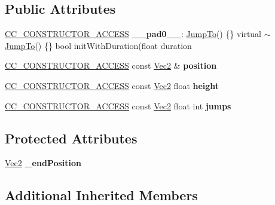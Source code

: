 \subsection*{Public Attributes}
\begin{DoxyCompactItemize}
\item 
\mbox{\label{classJumpTo_acccae872c5de91cdd1bdb469b8a07ce9}} 
\hyperlink{_2cocos2d_2cocos_2base_2ccConfig_8h_a25ef1314f97c35a2ed3d029b0ead6da0}{C\+C\+\_\+\+C\+O\+N\+S\+T\+R\+U\+C\+T\+O\+R\+\_\+\+A\+C\+C\+E\+SS} {\bfseries \+\_\+\+\_\+pad0\+\_\+\+\_\+}\+: \hyperlink{classJumpTo}{Jump\+To}() \{\} virtual $\sim$\hyperlink{classJumpTo}{Jump\+To}() \{\} bool init\+With\+Duration(float duration
\item 
\mbox{\label{classJumpTo_a5449c463ff3535a730153d6dbfb94b71}} 
\hyperlink{_2cocos2d_2cocos_2base_2ccConfig_8h_a25ef1314f97c35a2ed3d029b0ead6da0}{C\+C\+\_\+\+C\+O\+N\+S\+T\+R\+U\+C\+T\+O\+R\+\_\+\+A\+C\+C\+E\+SS} const \hyperlink{classVec2}{Vec2} \& {\bfseries position}
\item 
\mbox{\label{classJumpTo_a3d949c0bd312d4f242084156cedd2be4}} 
\hyperlink{_2cocos2d_2cocos_2base_2ccConfig_8h_a25ef1314f97c35a2ed3d029b0ead6da0}{C\+C\+\_\+\+C\+O\+N\+S\+T\+R\+U\+C\+T\+O\+R\+\_\+\+A\+C\+C\+E\+SS} const \hyperlink{classVec2}{Vec2} float {\bfseries height}
\item 
\mbox{\label{classJumpTo_ae3d5f2de5e50e816fbdbe821ab5eee4f}} 
\hyperlink{_2cocos2d_2cocos_2base_2ccConfig_8h_a25ef1314f97c35a2ed3d029b0ead6da0}{C\+C\+\_\+\+C\+O\+N\+S\+T\+R\+U\+C\+T\+O\+R\+\_\+\+A\+C\+C\+E\+SS} const \hyperlink{classVec2}{Vec2} float int {\bfseries jumps}
\end{DoxyCompactItemize}
\subsection*{Protected Attributes}
\begin{DoxyCompactItemize}
\item 
\mbox{\label{classJumpTo_afd95b95c68bd5c8f9fa7d3be06519e4d}} 
\hyperlink{classVec2}{Vec2} {\bfseries \+\_\+end\+Position}
\end{DoxyCompactItemize}
\subsection*{Additional Inherited Members}


